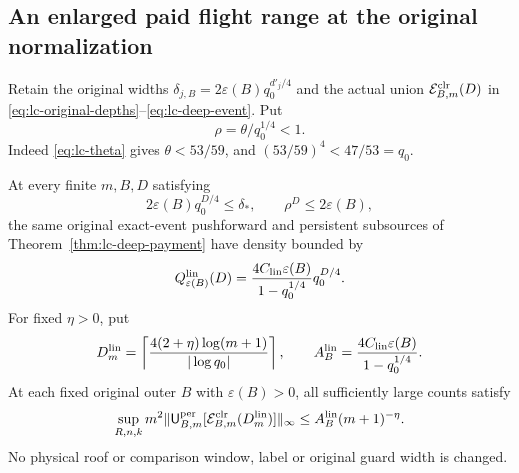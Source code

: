 \subsection{An enlarged paid flight range at the original normalization}
Retain the original widths
$\delta_{j,B}=2\varepsilon(B)q_0^{d'_j/4}$ and the actual union
$\mathcal E^{\rm clr}_{B,m}(D)$ in
\eqref{eq:lc-original-depths}--\eqref{eq:lc-deep-event}.  Put
\begin{equation}\label{eq:sc-ratio}
                         \rho=\theta/q_0^{1/4}<1.
\end{equation}
Indeed \eqref{eq:lc-theta} gives $\theta<53/59$, and
$(53/59)^4<47/53=q_0$.

\begin{theorem}
\label{thm:sc-deep-payment}
At every finite $m,B,D$ satisfying
\begin{equation}\label{eq:sc-depth-conditions}
 2\varepsilon(B)q_0^{D/4}\le\delta_*,
                 \qquad \rho^D\le2\varepsilon(B),
\end{equation}
the same original exact-event pushforward and persistent subsources
of Theorem~\ref{thm:lc-deep-payment} have density bounded by
\begin{equation}\label{eq:sc-deep-finite}
 Q^{\rm lin}_{\varepsilon(B)}(D)
       =\frac{4C_{\rm lin}\varepsilon(B)}{1-q_0^{1/4}}q_0^{D/4}.
\end{equation}
For fixed $\eta>0$, put
\begin{equation}\label{eq:sc-log-depth}
 D_m^{\rm lin}
   =\left\lceil\frac{4(2+\eta)\log(m+1)}{|\log q_0|}\right\rceil,
 \qquad
 A_B^{\rm lin}=\frac{4C_{\rm lin}\varepsilon(B)}{1-q_0^{1/4}}.
\end{equation}
At each fixed original outer $B$ with $\varepsilon(B)>0$, all
sufficiently large counts satisfy
\begin{equation}\label{eq:sc-normalized-rate}
 \sup_{R,n,k}m^2
 \|\mathsf U^{\rm per}_{B,m}
       [\mathcal E^{\rm clr}_{B,m}(D_m^{\rm lin})]\|_\infty
              \le A_B^{\rm lin}(m+1)^{-\eta}.
\end{equation}
No physical roof or comparison window, label or original guard
width is changed.
\end{theorem}
